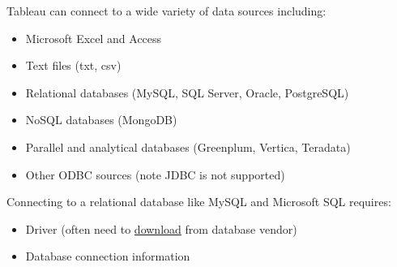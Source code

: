 \documentclass[xcolor=svgnames]{beamer} %
\begin{document}
\begin{frame}
Tableau can connect to a wide variety of data sources including:
\begin{itemize}
\item Microsoft Excel and Access
\item Text files (txt, csv)
\item Relational databases (MySQL, SQL Server, Oracle, PostgreSQL)
\item NoSQL databases (MongoDB)
\item Parallel and analytical databases (Greenplum, Vertica, Teradata)
\item Other ODBC sources (note JDBC is not supported)
\end{itemize}




\end{frame}




\begin{frame}
Connecting to a relational database like MySQL  and Microsoft SQL requires:
\begin{itemize}
\item Driver (often need to \href{https://www.tableau.com/support/drivers}{download} from database vendor) %
\item Database connection information %
\end{itemize}
\end{frame}
\end{document}
